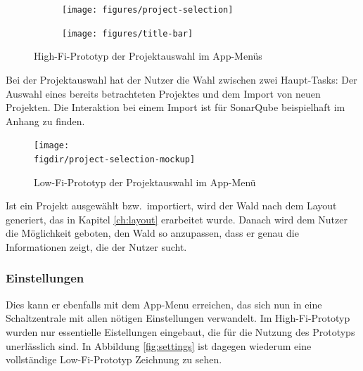 \begin{figure}[htb]
  \centering
  \begin{subfigure}[t]{\textwidth}
    \centering
    \texttt{[image: figures/project-selection]}
     \label{fig:project-selection}
  \end{subfigure}
  \par\bigskip
  \begin{subfigure}[t]{\textwidth}
    \centering
  	\texttt{[image: figures/title-bar]}
  	 \label{fig:title-bar}
  \end{subfigure}
  \caption{High-Fi-Prototyp der Projektauswahl im App-Menüs} \label{fig:app-menu}
\end{figure}


Bei der Projektauswahl hat der Nutzer die Wahl zwischen zwei Haupt-Tasks: Der Auswahl eines bereits betrachteten Projektes und dem Import von neuen Projekten. Die Interaktion bei einem Import ist für SonarQube beispielhaft im Anhang zu finden.

\begin{figure}[htb]
  \texttt{[image: \\figdir/project-selection-mockup]}
  \caption{Low-Fi-Prototyp der Projektauswahl im App-Menü}
  \label{fig:project-selection-mockup}
\end{figure}

Ist ein Projekt ausgewählt bzw.\ importiert, wird der Wald nach dem Layout generiert, das in Kapitel \ref{ch:layout} erarbeitet wurde. Danach wird dem Nutzer die Möglichkeit geboten, den Wald so anzupassen, dass er genau die Informationen zeigt, die der Nutzer sucht.

\subsubsection*{Einstellungen}

Dies kann er ebenfalls mit dem App-Menu erreichen, das sich nun in eine Schaltzentrale mit allen nötigen Einstellungen verwandelt. Im High-Fi-Prototyp wurden nur essentielle Eistellungen eingebaut, die für die Nutzung des Prototyps unerlässlich sind. In Abbildung \ref{fig:settings} ist dagegen wiederum eine vollständige Low-Fi-Prototyp Zeichnung zu sehen.

